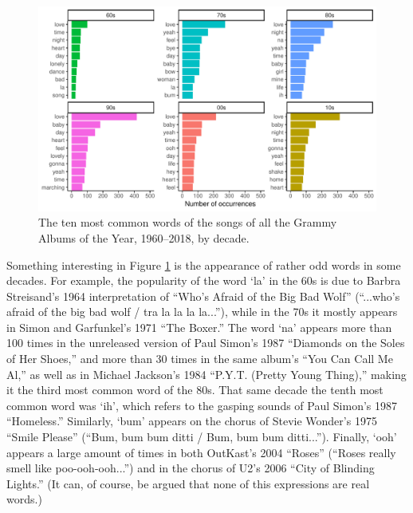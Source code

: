 \documentclass{article}
\newenvironment{aside}
  {\begin{mdframed}[style=0,%
      leftline=false,rightline=false,leftmargin=2em,rightmargin=2em,%
          innerleftmargin=0pt,innerrightmargin=0pt,linewidth=0.75pt,%
      skipabove=7pt,skipbelow=7pt]\small}
  {\end{mdframed}}
\begin{document}

\begin{figure}[h]
    \centering
    \includegraphics[scale=0.65]{Plots/graph_common_words_decade_FW.pdf}
    \caption{The ten most common words of the songs of all the Grammy Albums of the Year, 1960--2018, by decade.}
    \label{fig:common_words_decade}
\end{figure}


\FloatBarrier


\begin{aside}
        Something interesting in Figure \ref{fig:common_words_decade} is the appearance of rather odd words in some decades. For example, the popularity of the word `la' in the 60s is due to Barbra Streisand's 1964 interpretation of ``Who's Afraid of the Big Bad Wolf'' (``...who's afraid of the big bad wolf / tra la la la la...''), while in the 70s it mostly appears in Simon and Garfunkel's 1971 ``The Boxer.'' The word `na' appears more than 100 times in the unreleased version of Paul Simon's 1987 ``Diamonds on the Soles of Her Shoes,'' and more than 30 times in the same album's ``You Can Call Me Al,'' as well as in Michael Jackson's 1984 ``P.Y.T. (Pretty Young Thing),'' making it the third most common word of the 80s. That same decade the tenth most common word was `ih', which refers to the gasping sounds of Paul Simon's 1987 ``Homeless.'' Similarly, `bum' appears on the chorus of Stevie Wonder's 1975 ``Smile Please'' (``Bum, bum bum ditti / Bum, bum bum ditti...''). Finally, `ooh' appears a large amount of times in both OutKast's 2004 ``Roses'' (``Roses really smell like poo-ooh-ooh...'') and in the chorus of U2's 2006 ``City of Blinding Lights.'' (It can, of course, be argued that none of this expressions are real words.)
\end{aside}
\end{document}
